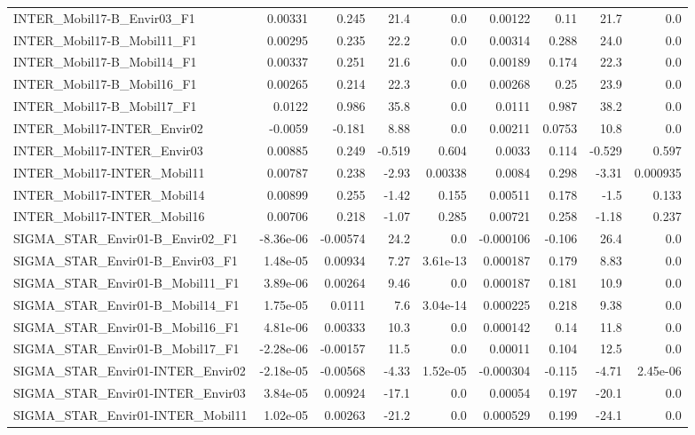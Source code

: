 \begin{tabular}{lrrrrrrrr}
INTER_Mobil17-B_Envir03_F1 & 0.00331 & 0.245 & 21.4 & 0.0 & 0.00122 & 0.11 & 21.7 & 0.0 \\
INTER_Mobil17-B_Mobil11_F1 & 0.00295 & 0.235 & 22.2 & 0.0 & 0.00314 & 0.288 & 24.0 & 0.0 \\
INTER_Mobil17-B_Mobil14_F1 & 0.00337 & 0.251 & 21.6 & 0.0 & 0.00189 & 0.174 & 22.3 & 0.0 \\
INTER_Mobil17-B_Mobil16_F1 & 0.00265 & 0.214 & 22.3 & 0.0 & 0.00268 & 0.25 & 23.9 & 0.0 \\
INTER_Mobil17-B_Mobil17_F1 & 0.0122 & 0.986 & 35.8 & 0.0 & 0.0111 & 0.987 & 38.2 & 0.0 \\
INTER_Mobil17-INTER_Envir02 & -0.0059 & -0.181 & 8.88 & 0.0 & 0.00211 & 0.0753 & 10.8 & 0.0 \\
INTER_Mobil17-INTER_Envir03 & 0.00885 & 0.249 & -0.519 & 0.604 & 0.0033 & 0.114 & -0.529 & 0.597 \\
INTER_Mobil17-INTER_Mobil11 & 0.00787 & 0.238 & -2.93 & 0.00338 & 0.0084 & 0.298 & -3.31 & 0.000935 \\
INTER_Mobil17-INTER_Mobil14 & 0.00899 & 0.255 & -1.42 & 0.155 & 0.00511 & 0.178 & -1.5 & 0.133 \\
INTER_Mobil17-INTER_Mobil16 & 0.00706 & 0.218 & -1.07 & 0.285 & 0.00721 & 0.258 & -1.18 & 0.237 \\
SIGMA_STAR_Envir01-B_Envir02_F1 & -8.36e-06 & -0.00574 & 24.2 & 0.0 & -0.000106 & -0.106 & 26.4 & 0.0 \\
SIGMA_STAR_Envir01-B_Envir03_F1 & 1.48e-05 & 0.00934 & 7.27 & 3.61e-13 & 0.000187 & 0.179 & 8.83 & 0.0 \\
SIGMA_STAR_Envir01-B_Mobil11_F1 & 3.89e-06 & 0.00264 & 9.46 & 0.0 & 0.000187 & 0.181 & 10.9 & 0.0 \\
SIGMA_STAR_Envir01-B_Mobil14_F1 & 1.75e-05 & 0.0111 & 7.6 & 3.04e-14 & 0.000225 & 0.218 & 9.38 & 0.0 \\
SIGMA_STAR_Envir01-B_Mobil16_F1 & 4.81e-06 & 0.00333 & 10.3 & 0.0 & 0.000142 & 0.14 & 11.8 & 0.0 \\
SIGMA_STAR_Envir01-B_Mobil17_F1 & -2.28e-06 & -0.00157 & 11.5 & 0.0 & 0.00011 & 0.104 & 12.5 & 0.0 \\
SIGMA_STAR_Envir01-INTER_Envir02 & -2.18e-05 & -0.00568 & -4.33 & 1.52e-05 & -0.000304 & -0.115 & -4.71 & 2.45e-06 \\
SIGMA_STAR_Envir01-INTER_Envir03 & 3.84e-05 & 0.00924 & -17.1 & 0.0 & 0.00054 & 0.197 & -20.1 & 0.0 \\
SIGMA_STAR_Envir01-INTER_Mobil11 & 1.02e-05 & 0.00263 & -21.2 & 0.0 & 0.000529 & 0.199 & -24.1 & 0.0 \\

\end{tabular}
